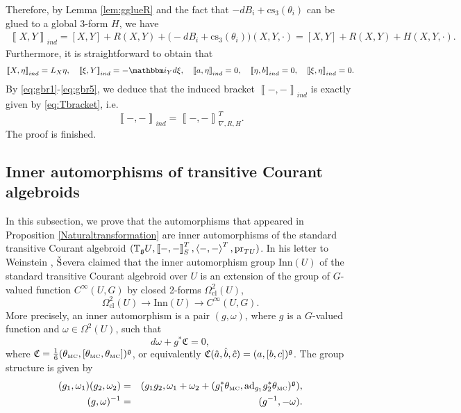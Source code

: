 \documentclass[letterpaper,10pt, oneside]{article} %
\newcommand{\tagu}{{\mathbb{T}_\g U}}
\newcommand{\cl}{\mathrm{cl}}
\newcommand{\ii}{\mathbbm i}
\newcommand{\cs}{\mathrm{cs}}
\newcommand{\TM}{\theta_{\scriptscriptstyle \mathrm{MC}}}
\newcommand{\frkC}{\mathfrak C}
\def\qed{\hfill ~\vrule height6pt width6pt depth0pt}
\newcommand{\pair}[1]{\left\langle #1\right\rangle}
\newcommand{\Courant}[1]{\left\llbracket  #1\right\rrbracket }
\newcommand{\Inn}{\mathrm{Inn}}
\newcommand{\ad}{\mathrm{ad}}
\newcommand{\pr}{\mathrm{pr}}
\begin{document}
  Therefore, by Lemma \ref{lem:gglueR} and the fact that $-dB_i+\cs_3(\theta_i)$ can be glued to a global 3-form $H$, we have
  \begin{eqnarray}\label{eq:gbr4}
  \Courant{X,Y}_{ind}=[X,Y]+R(X,Y)+\Big(-dB_i+\cs_3(\theta_i)\Big)(X,Y,\cdot)=[X,Y]+R(X,Y)+H(X,Y,\cdot).
  \end{eqnarray}
  Furthermore, it is straightforward to obtain that
  \begin{eqnarray}
    \label{eq:gbr5}\Courant{X,\eta}_{ind}=L_X\eta,\quad\Courant{\xi,Y}_{ind}=-\ii_Yd\xi,\quad\Courant{a,\eta}_{ind}=0,\quad\Courant{\eta,b}_{ind}=0,\quad\Courant{\xi,\eta}_{ind}=0.
  \end{eqnarray}
  By \eqref{eq:gbr1}-\eqref{eq:gbr5}, we deduce that the induced bracket $\Courant{-,-}_{ind}$ is exactly given by  \eqref{eq:Tbracket}, i.e. $$\Courant{-,-}_{ind}=\Courant{-,-}^T_{\nabla,R,H}.$$
  The proof is finished. \qed

\subsection{Inner automorphisms of transitive Courant algebroids}\label{app:innerauto}
In this subsection, we prove that the automorphisms that appeared in Proposition \ref{Naturaltransformation} are inner automorphisms of the standard transitive Courant algebroid $(\tagu, \Courant{-,-}^T_S, \pair{-,-}^T, \pr_{TU})$. In his letter to Weinstein \cite{sevlet}, ${\rm\check{S}}$evera claimed that the inner automorphism group $\Inn(U)$ of the standard transitive Courant algebroid over $U$ is an extension of the group of $G$-valued function $C^\infty(U, G)$ by closed 2-forms $\Omega^2_{\cl}(U)$,
\begin{equation}
 \Omega^2_{\cl}(U) \to \Inn(U) \to  C^\infty(U, G).
\end{equation}
More precisely, an inner automorphism is a pair  $(g,\omega)$, where $g$ is a $G$-valued function and $\omega\in \Omega^2(U)$, such that
\begin{equation}\label{eq:gw}
d\omega+g^*\frkC=0,
\end{equation}
where $\frkC=\frac{1}{6}(\TM,[\TM,\TM])^\g$, or equivalently $\frkC(\hat{a},\hat{b},\hat{c})=(a,[b,c])^\g$. The group structure is given by
\begin{eqnarray*}
(g_1,\omega_1)(g_2,\omega_2)&=&(g_1g_2,\omega_1+\omega_2+(g_1^*\TM,\ad_{g_1}g_2^*\TM)^\g),\\
(g,\omega)^{-1}&=&(g^{-1},-\omega).
\end{eqnarray*}
\end{document}
